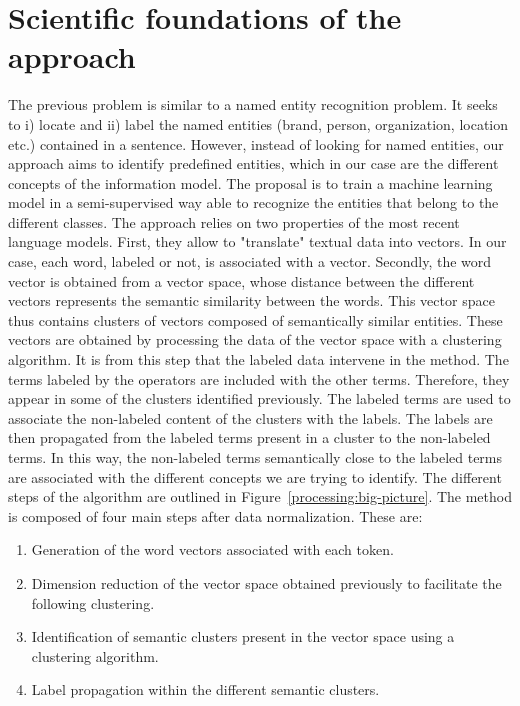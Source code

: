 \section{Scientific foundations of the approach}
The previous problem is similar to a named entity recognition problem.
It seeks to i) locate and ii) label the named entities (brand, person, organization, location etc.) contained in a sentence.
However, instead of looking for named entities, our approach aims to identify predefined
entities, which in our case are the different concepts of the information model.
The proposal is to train a machine learning model in a semi-supervised way able to recognize the entities that belong to the different classes.
The approach relies on two properties of the most recent language models.
First, they allow to "translate" textual data into vectors.
In our case, each word, labeled or not, is associated with a vector.
Secondly, the word vector is obtained from a vector space, whose distance between the different
vectors represents the semantic similarity between the words.
This vector space thus contains clusters of vectors composed of semantically similar entities.
These vectors are obtained by processing the data of the vector space with a clustering algorithm.
It is from this step that the labeled data intervene in the method.
The terms labeled by the operators are included with the other terms.
Therefore, they appear in some of the clusters identified previously.
The labeled terms are used to associate the non-labeled content of the clusters with the labels.
The labels are then propagated from the labeled terms present in a cluster to the non-labeled terms.
In this way, the non-labeled terms semantically close to the labeled terms are associated with the different concepts we are trying to identify.
The different steps of the algorithm are outlined in Figure~\ref{processing:big-picture}.
The method is composed of four main steps after data normalization.
These are:

\begin{enumerate}
    \item Generation of the word vectors associated with each token.
    \item Dimension reduction of the vector space obtained previously to facilitate the following clustering.
    \item Identification of semantic clusters present in the vector space using a clustering algorithm.
    \item Label propagation within the different semantic clusters.
\end{enumerate}

